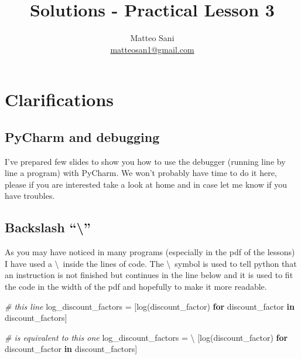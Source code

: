 \documentclass[11pt]{article}
\title{Solutions - Practical Lesson 3}
\author{Matteo Sani \\ \href{mailto:matteosan1@gmail.com}{matteosan1@gmail.com}}
\newenvironment{Shaded}{}{}
\newcommand{\KeywordTok}[1]{\textcolor[rgb]{0.00,0.44,0.13}{\textbf{{#1}}}}
\newcommand{\CommentTok}[1]{\textcolor[rgb]{0.38,0.63,0.69}{\textit{{#1}}}}
\newcommand{\NormalTok}[1]{{#1}}
\newcommand{\ControlFlowTok}[1]{\textcolor[rgb]{0.00,0.44,0.13}{\textbf{{#1}}}}
\newcommand{\OperatorTok}[1]{\textcolor[rgb]{0.40,0.40,0.40}{{#1}}}
\begin{document}
    
    
    \maketitle
    
    

    
    \hypertarget{clarifications}{%
\section{Clarifications}\label{clarifications}}

\hypertarget{pycharm-and-debugging}{%
\subsection{PyCharm and debugging}\label{pycharm-and-debugging}}

I've prepared few slides to show you how to use the debugger (running
line by line a program) with PyCharm. We won't probably have time to do
it here, please if you are interested take a look at home and in case
let me know if you have troubles.

\hypertarget{section}{%
\subsection{\texorpdfstring{Backslash ``\textbackslash''
}{ }}\label{section}}

As you may have noticed in many programs (especially in the pdf of the
lessons) I have used a \textbackslash~inside the lines of code. The \textbackslash~symbol is used to
tell python that an instruction is not finished but continues in the
line below and it is used to fit the code in the width of the pdf and
hopefully to make it more readable.

\begin{Shaded}
\begin{Highlighting}[]
\CommentTok{# this line}
\NormalTok{log_discount_factors }\OperatorTok{=}\NormalTok{ [log(discount_factor) }\ControlFlowTok{for}\NormalTok{ discount_factor }\KeywordTok{in}\NormalTok{ discount_factors]}

\CommentTok{# is equivalent to this one }
\NormalTok{log_discount_factors }\OperatorTok{=} \OperatorTok{\textbackslash{}}
\NormalTok{    [log(discount_factor) }\ControlFlowTok{for}\NormalTok{ discount_factor }\KeywordTok{in}\NormalTok{ discount_factors]}
\end{Highlighting}
\end{Shaded}
\end{document}
